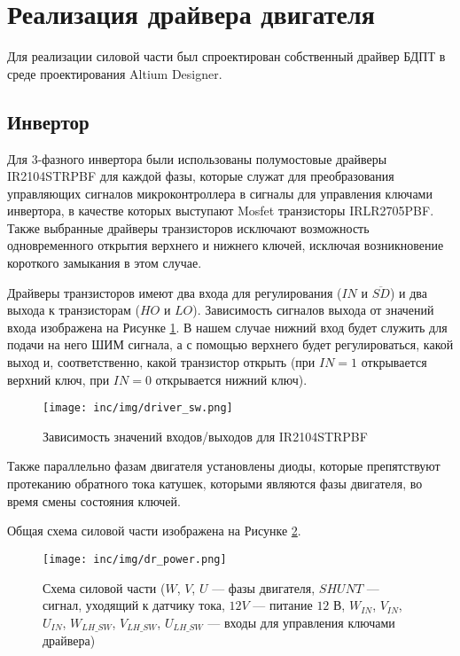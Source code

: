 \section{Реализация драйвера двигателя}
\label{sec:driver}

Для реализации силовой части был спроектирован собственный драйвер БДПТ в среде проектирования Altium Designer.

\subsection{Инвертор}
\label{sec:inv}

Для 3-фазного инвертора были использованы полумостовые драйверы IR2104STRPBF для каждой фазы, которые служат для преобразования управляющих сигналов микроконтроллера в сигналы для управления ключами инвертора, в качестве которых выступают Mosfet транзисторы IRLR2705PBF. Также выбранные драйверы транзисторов исключают возможность одновременного открытия верхнего и нижнего ключей, исключая возникновение короткого замыкания в этом случае.

Драйверы транзисторов имеют два входа для регулирования ($IN$ и $\overline{SD}$) и два выхода к транзисторам ($HO$ и $LO$). Зависимость сигналов выхода от значений входа изображена на Рисунке \ref{pic:driver_sw}. В нашем случае нижний вход будет служить для подачи на него ШИМ сигнала, а с помощью верхнего будет регулироваться, какой выход и, соответственно, какой транзистор открыть (при $IN=1$ открывается верхний ключ, при $IN=0$ открывается нижний ключ).

\begin{figure}[!h]
\centering
\texttt{[image: inc/img/driver\_sw.png]}
\caption{Зависимость значений входов/выходов для IR2104STRPBF}
\label{pic:driver_sw}
\end{figure}

Также параллельно фазам двигателя установлены диоды, которые препятствуют протеканию обратного тока катушек, которыми являются фазы двигателя, во время смены состояния ключей.

Общая схема силовой части изображена на Рисунке \ref{pic:dr_power}.

\begin{figure}[!h]
\centering
\texttt{[image: inc/img/dr\_power.png]}
\caption{Схема силовой части ($W$, $V$, $U$ --- фазы двигателя, $SHUNT$ --- сигнал, уходящий к датчику тока, $12V$ --- питание $12$ В, $W_{IN}$, $V_{IN}$, $U_{IN}$, $W_{LH\_SW}$, $V_{LH\_SW}$, $U_{LH\_SW}$ --- входы для управления ключами драйвера)}
\label{pic:dr_power}
\end{figure}
\clearpage
